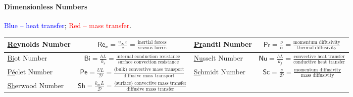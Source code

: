 \documentclass[10pt, a4paper, table]{article}
\newcommand{\Ree}{\mathsf{Re}}
\newcommand{\Bi}{\mathsf{Bi}}
\newcommand{\Prr}{\mathsf{Pr}}
\newcommand{\Nuu}{\mathsf{Nu}}
\newcommand{\Pe}{\mathsf{Pe}}
\newcommand{\Sc}{\mathsf{Sc}}
\newcommand{\Sh}{\mathsf{Sh}}
\begin{document}
\begin{mdframed}\vspace{-.5cm}
\paragraph{Dimensionless Numbers} \textcolor{blue}{Blue -- heat transfer}; \textcolor{red}{Red -- mass transfer}.

\begin{table}[H] \vspace{-.2cm} %
\centering
\begin{tabular}{l c | l c}
\toprule

\cellcolor{heat}\underline{Re}ynolds Number 
& \cellcolor{heat}$\displaystyle \Ree_{x} = \frac{u_{\infty}x}{\nu} = \frac{\text{inertial forces}}{\text{viscous forces}}$ 
& 
\cellcolor{heat}\underline{Pr}andtl Number 
& \cellcolor{heat}$\displaystyle \Prr = \frac{\nu}{\alpha} = \frac{\text{momentum diffusivity}}{\text{thermal diffusivity}}$ 
\\

\midrule

\cellcolor{heat}\underline{Bi}ot Number 
& \cellcolor{heat}$\displaystyle \Bi = \frac{hL}{k_s} = \frac{\text{internal conduction resistance}}{\text{surface convection resistance}}$ 
& 
\cellcolor{heat}\underline{Nu}sselt Number 
& \cellcolor{heat}$\displaystyle \Nuu = \frac{hL}{k_f} = \frac{\text{convective heat transfer}}{\text{conductive heat transfer}}$ 
\\

\midrule

\cellcolor{mass}\underline{P\'e}clet Number 
& \cellcolor{mass}$\displaystyle \Pe = \frac{UL}{\mathcal{D}} = \frac{\text{(bulk) convective mass transport}}{\text{diffusive mass transport}}$ 
& 
\cellcolor{mass}\underline{Sc}hmidt Number 
& \cellcolor{mass}$\displaystyle \Sc = \frac{\nu}{\mathcal{D}} = \frac{\text{momentum diffusivity}}{\text{mass diffusivity}}$ 
\\

\midrule

\cellcolor{mass}\underline{Sh}erwood Number 
& \cellcolor{mass}$\displaystyle \Sh = \frac{k_m L}{\mathcal{D}} = \frac{\text{(surface) convective mass transfer}}{\text{diffusive mass transfer}}$ 
& & \\

\bottomrule
\end{tabular}
\end{table}
\end{mdframed}
\end{document}
